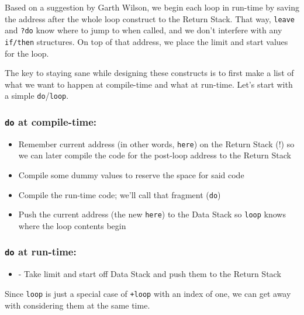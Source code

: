 Based on a suggestion by Garth Wilson, we begin each loop in run-time by saving
the address after the whole loop construct to the Return Stack. That way,
\texttt{leave} and \texttt{?do} know where to jump to when called, and we don't
interfere with any \texttt{if/then} structures. On top of that address, we place
the limit and start values for the loop. 

The key to staying sane while designing these constructs is to first make
a list of what we want to happen at compile-time and what at run-time. Let's
start with a simple \texttt{do}/\texttt{loop}.

\subsubsection{\texttt{do} at compile-time:}

\begin{itemize}

        \item Remember current address (in other words, \texttt{here}) on the
                Return Stack (!) so we can later compile the code for the
                post-loop address to the Return Stack

        \item Compile some dummy values to reserve the space for said code

        \item Compile the run-time code; we'll call that fragment (\texttt{do})

        \item Push the current address (the new \texttt{here}) to the Data Stack
                so \texttt{loop} knows where the loop contents begin

\end{itemize}

\subsubsection{\texttt{do} at run-time:}

\begin{itemize}
        \item - Take limit and start off Data Stack and push them to the Return Stack
\end{itemize}

Since \texttt{loop} is just a special case of \texttt{+loop} with an index of
one, we can get away with considering them at the same time. 


